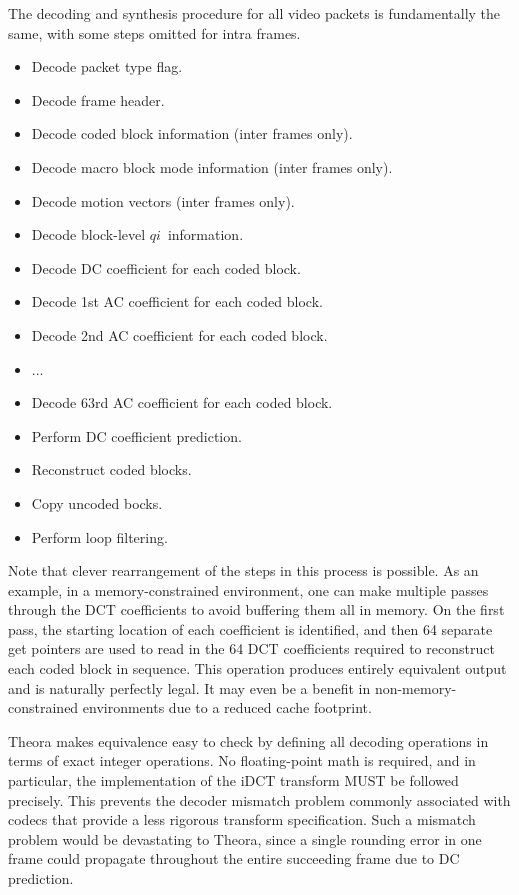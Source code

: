 \documentclass[11pt,letterpaper]{book}
\newcommand{\idx}[1]{{\ensuremath{\mathit{#1}}}}
\newcommand{\qi}{\idx{qi}}
\numberwithin{equation}{chapter}
\numberwithin{figure}{chapter}
\numberwithin{table}{chapter}
\begin{document}
The decoding and synthesis procedure for all video packets is fundamentally the
 same, with some steps omitted for intra frames.
\begin{itemize}
\item
Decode packet type flag.
\item
Decode frame header.
\item
Decode coded block information (inter frames only).
\item
Decode macro block mode information (inter frames only).
\item
Decode motion vectors (inter frames only).
\item
Decode block-level \qi\ information.
\item
Decode DC coefficient for each coded block.
\item
Decode 1st AC coefficient for each coded block.
\item
Decode 2nd AC coefficient for each coded block.
\item
$\ldots$
\item
Decode 63rd AC coefficient for each coded block.
\item Perform DC coefficient prediction.
\item Reconstruct coded blocks.
\item Copy uncoded bocks.
\item Perform loop filtering.
\end{itemize}

Note that clever rearrangement of the steps in this process is possible.
As an example, in a memory-constrained environment, one can make multiple
 passes through the DCT coefficients to avoid buffering them all in memory.
On the first pass, the starting location of each coefficient is identified, and
 then 64 separate get pointers are used to read in the 64 DCT coefficients
 required to reconstruct each coded block in sequence.
This operation produces entirely equivalent output and is naturally perfectly
 legal.
It may even be a benefit in non-memory-constrained environments due to a
 reduced cache footprint.

Theora makes equivalence easy to check by defining all decoding operations in
 terms of exact integer operations.
No floating-point math is required, and in particular, the implementation of
 the iDCT transform MUST be followed precisely.
This prevents the decoder mismatch problem commonly associated with codecs that
 provide a less rigorous transform specification.
Such a mismatch problem would be devastating to Theora, since a single rounding
 error in one frame could propagate throughout the entire succeeding frame due
 to DC prediction.
\end{document}

